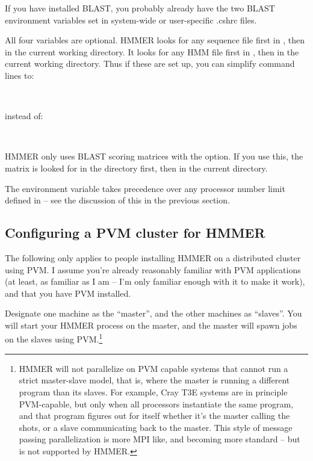 If you have installed BLAST, you probably already have the two BLAST
environment variables set in system-wide or user-specific .cshrc
files.

All four variables are optional. HMMER looks for any sequence file
first in , then in the current working directory. It
looks for any HMM file first in , then in the current
working directory. Thus if these are set up, you can simplify command
lines to:

\\

instead of:

\\

HMMER only uses BLAST scoring matrices with the  option. If you use this, the matrix is looked for in the
 directory first, then in the current directory.

The  environment variable takes precedence over any
 processor number limit defined in 
-- see the discussion of this in the previous section.

\subsection{Configuring a PVM cluster for HMMER}

The following only applies to people installing HMMER on a distributed
cluster using PVM. I assume you're already reasonably familiar with
PVM applications (at least, as familiar as I am -- I'm only familiar
enough with it to make it work), and that you have PVM installed.

Designate one machine as the ``master'', and the other machines as
``slaves''. You will start your HMMER process on the master, and the
master will spawn jobs on the slaves using PVM.\footnote{HMMER will
not parallelize on PVM capable systems that cannot run a strict
master-slave model, that is, where the master is running a different
program than its slaves. For example, Cray T3E systems are in
principle PVM-capable, but only when all processors instantiate the
same program, and that program figures out for itself whether it's the
master calling the shots, or a slave communicating back to the
master. This style of message passing parallelization is more MPI
like, and becoming more standard -- but is not supported by HMMER.}

